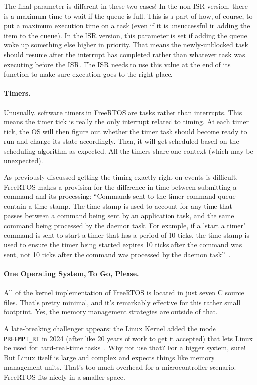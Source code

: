 The final parameter is different in these two cases! In the non-ISR version, there is a maximum time to wait if the queue is full. This is a part of how, of course, to put a maximum execution time on a task (even if it is unsuccessful in adding the item to the queue). In the ISR version, this parameter is set if adding the queue woke up something else higher in priority. That means the newly-unblocked task should resume after the interrupt has completed rather than whatever task was executing before the ISR. The ISR needs to use this value at the end of its function to make sure execution goes to the right place.

\paragraph{Timers.}
Unusually, software timers in FreeRTOS are tasks rather than interrupts. This means the timer tick is really the only interrupt related to timing. At each timer tick, the OS will then figure out whether the timer task should become ready to run and change its state accordingly. Then, it will get scheduled based on the scheduling algorithm as expected. All the timers share one context (which may be unexpected). 

As previously discussed getting the timing exactly right on events is difficult. FreeRTOS makes a provision for the difference in time between submitting a command and its processing: ``Commands sent to the timer command queue contain a time stamp. The time stamp is used to account for any time that passes between a command being sent by an application task, and the same command being processed by the daemon task. For example, if a 'start a timer' command is sent to start a timer that has a period of 10 ticks, the time stamp is used to ensure the timer being started expires 10 ticks after the command was sent, not 10 ticks after the command was processed by the daemon task''~\cite{freertos}.

\paragraph{One Operating System, To Go, Please.}
All of the kernel implementation of FreeRTOS is located in just seven C source files. That's pretty minimal, and it's remarkably effective for this rather small footprint. Yes, the memory management strategies are outside of that. 

A late-breaking challenger appears: the Linux Kernel added the mode \texttt{PREEMPT\_RT} in 2024 (after like 20 years of work to get it accepted) that lets Linux be used for hard-real-time tasks~\cite{preempt-rt}. Why not use that? For a bigger system, sure! But Linux itself is large and complex and expects things like memory management units. That's too much overhead for a microcontroller scenario. FreeRTOS fits nicely in a smaller space.

